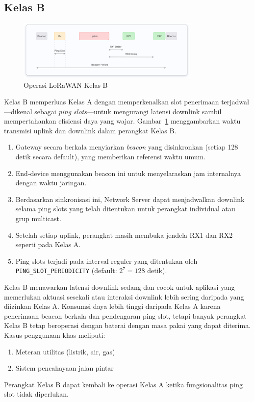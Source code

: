 \subsection{Kelas B}
\begin{figure}
    \centering
    \includegraphics[width=0.8\textwidth]{figures/class-b.png}
    \caption{Operasi LoRaWAN Kelas B}
    \label{fig:lora_class_b}
\end{figure}
Kelas B memperluas Kelas A dengan memperkenalkan slot penerimaan terjadwal—dikenal sebagai \emph{ping slots}—untuk mengurangi latensi downlink sambil mempertahankan efisiensi daya yang wajar.
Gambar~\ref{fig:lora_class_b} menggambarkan waktu transmisi uplink dan downlink dalam perangkat Kelas B.
\begin{enumerate}
    \item Gateway secara berkala menyiarkan \emph{beacon} yang disinkronkan (setiap 128 detik secara default), yang memberikan referensi waktu umum.
    \item End-device menggunakan beacon ini untuk menyelaraskan jam internalnya dengan waktu jaringan.
    \item Berdasarkan sinkronisasi ini, Network Server dapat menjadwalkan downlink selama ping slots yang telah ditentukan untuk perangkat individual atau grup multicast.
    \item Setelah setiap uplink, perangkat masih membuka jendela RX1 dan RX2 seperti pada Kelas A.
    \item Ping slots terjadi pada interval reguler yang ditentukan oleh \texttt{PING\_SLOT\_PERIODICITY} (default: $2^7 = 128$ detik).
\end{enumerate}
Kelas B menawarkan latensi downlink sedang dan cocok untuk aplikasi yang memerlukan aktuasi sesekali atau interaksi downlink lebih sering daripada yang diizinkan Kelas A. Konsumsi daya lebih tinggi daripada Kelas A karena penerimaan beacon berkala dan pendengaran ping slot, tetapi banyak perangkat Kelas B tetap beroperasi dengan baterai dengan masa pakai yang dapat diterima.
Kasus penggunaan khas meliputi:
\begin{enumerate}
    \item Meteran utilitas (listrik, air, gas)
    \item Sistem pencahayaan jalan pintar
\end{enumerate}
Perangkat Kelas B dapat kembali ke operasi Kelas A ketika fungsionalitas ping slot tidak diperlukan.
